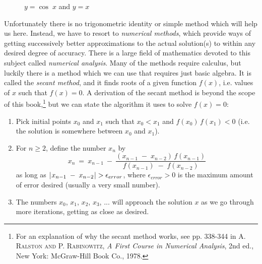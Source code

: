 \begin{figure}[h]
 \begin{center}
  \vspace{-6mm}
 \end{center}
 \caption[]{\quad $y=\cos\;x$ and $y=x$}
 \label{fig:cosineeqx}
\end{figure}

Unfortunately
there is no trigonometric identity or simple method which will help us here. Instead, we have to
resort to \emph{numerical methods}, which provide ways of getting
successively better approximations to the actual solution(s) to within any desired degree of
accuracy. There is a large field of mathematics devoted to this subject called \emph{numerical
analysis}. Many of the methods require calculus, but luckily there is a method which we can use
that requires just basic algebra. It is called the \emph{secant method}, and it
finds roots of a given function $f(x)$, i.e. values of $x$ such that $f(x)=0$. A derivation of the
secant method is beyond the scope of this book,\footnote{For an explanation of why the secant method
 works, see pp. 338-344 in \textsc{A. Ralston and P. Rabinowitz}, \emph{A First Course in Numerical
 Analysis}, 2nd ed., New York: McGraw-Hill Book Co., 1978.} but we can state the algorithm it
 uses to solve $f(x)=0$:

\begin{enumerate}[\bfseries 1.]
 \item Pick initial points $x_0$ and $x_1$ such that $x_0 < x_1$ and $f(x_0)\,f(x_1) < 0$ (i.e.
  the solution is somewhere between $x_0$ and $x_1$).
 \item For $n \ge 2$, define the number $x_n$ by
  \begin{equation}\label{eqn:secantmethod}
   x_n ~=~ x_{n-1} ~-~ \dfrac{(x_{n-1} \;-\; x_{n-2})\,f(x_{n-1})}{f(x_{n-1}) \;-\; f(x_{n-2})}
  \end{equation}
  as long as $\lvert\mspace{1mu}x_{n-1} \;-\; x_{n-2}\mspace{1mu}\rvert > \epsilon_{error}$, where $\epsilon_{error} > 0$ is the
  maximum amount of error desired (usually a very small number).
 \item The numbers $x_0$, $x_1$, $x_2$, $x_3$, $...$ will approach the solution $x$ as we go through
 more iterations, getting as close as desired.
\end{enumerate}

